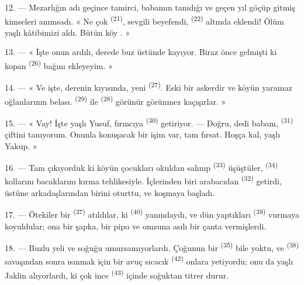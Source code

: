 12. --- Mezarlığın adı geçince tamirci, babamın tanıdığı ve geçen yıl göçüp
gitmiş kimseleri anımsadı. « Ne çok  \textsuperscript{(21)},
sevgili beyefendi,  \textsuperscript{(22)} altında eklendi!
Ölüm yaşlı kâtibimizi aldı. Bütün köy . »

13. --- « İşte onun ardılı, derede buz üstünde kayıyor. Biraz önce gelmişti ki
kopan  \textsuperscript{(26)} bağını ekleyeyim. »

14. --- « Ve işte, derenin kıyısında, yeni 
\textsuperscript{(27)}. Eski bir askerdir ve köyün yaramaz oğlanlarının
belası.  \textsuperscript{(29)} ile  \textsuperscript{(28)} görünür görünmez kaçışırlar. »

15. --- « Vay! İşte yaşlı Yusuf, fırıncıya 
\textsuperscript{(30)} getiriyor. --- Doğru, dedi babam, 
\textsuperscript{(31)} çiftini tanıyorum. Onunla konuşacak bir işim var, tam
fırsat. Hoşça kal, yaşlı Yakup. »

16. --- Tam çıkıyorduk ki köyün çocukları okuldan salınıp  \textsuperscript{(33)} üşüştüler, 
\textsuperscript{(34)} kollarını bacaklarını kırma tehlikesiyle. İçlerinden
biri arabacıdan  \textsuperscript{(32)} getirdi, üstüne
arkadaşlarından birini oturttu, ve koşmaya başladı.

17. --- Ötekiler bir  \textsuperscript{(37)} atıldılar, ki
 \textsuperscript{(40)} yanındaydı, ve dün yaptıkları
 \textsuperscript{(39)} vurmaya koyuldular; ona bir
şapka, bir pipo ve omzuna asılı bir çanta vermişlerdi.

18. --- Buzlu yeli ve soğuğu umursamıyorlardı. Çoğunun bir 
\textsuperscript{(35)} bile yoktu, ve 
\textsuperscript{(38)} savaşından sonra ısınmak için bir avuç sıcacık
 \textsuperscript{(42)} onlara yetiyordu; onu da yaşlı Jaklin
 alıyorlardı, ki çok ince 
\textsuperscript{(43)} içinde soğuktan titrer durur.

\VUsaut{3.0mm}
\VUsaut{3.0mm}

\VUsaut{4.0mm}

